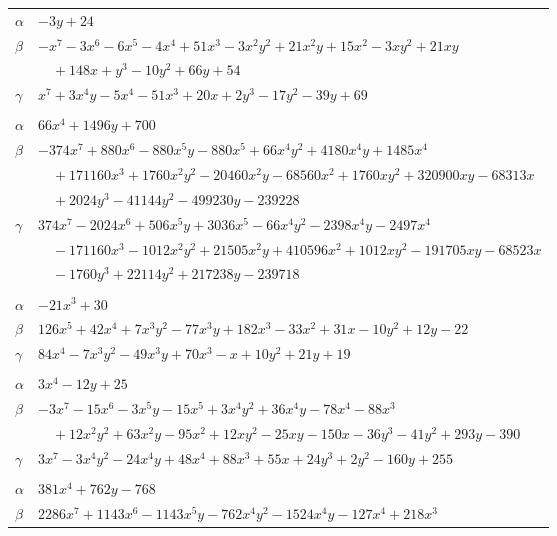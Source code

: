 \documentclass[11pt]{article}
\begin{document}
\begin{longtable}{@{}ll@{}}
$\alpha$ & $-3y+24$\\
$\beta$ & $-x^{7}-3x^{6}-6x^{5}-4x^{4}+51x^{3}-3x^{2}y^{2}+21x^{2}y+15x^{2}-3xy^{2}+21xy$\\
 & $\quad +148x+y^{3}-10y^{2}+66y+54$\\
$\gamma$ & $x^{7}+3x^{4}y-5x^{4}-51x^{3}+20x+2y^{3}-17y^{2}-39y+69$\\
\addlinespace[3pt]
\multicolumn{2}{@{}l}{$\{i,j\}=\{34,91\}$, $k_{ij}=2\cdot 3\cdot 5\cdot 7$}\\
$\alpha$ & $66x^{4}+1496y+700$\\
$\beta$ & $-374x^{7}+880x^{6}-880x^{5}y-880x^{5}+66x^{4}y^{2}+4180x^{4}y+1485x^{4}$\\
 & $\quad +171160x^{3}+1760x^{2}y^{2}-20460x^{2}y-68560x^{2}+1760xy^{2}+320900xy-68313x$\\
 & $\quad +2024y^{3}-41144y^{2}-499230y-239228$\\
$\gamma$ & $374x^{7}-2024x^{6}+506x^{5}y+3036x^{5}-66x^{4}y^{2}-2398x^{4}y-2497x^{4}$\\
 & $\quad -171160x^{3}-1012x^{2}y^{2}+21505x^{2}y+410596x^{2}+1012xy^{2}-191705xy-68523x$\\
 & $\quad -1760y^{3}+22114y^{2}+217238y-239718$\\
\addlinespace[3pt]
\multicolumn{2}{@{}l}{$\{i,j\}=\{34,96\}$, $k_{ij}=2\cdot 3^{2}\cdot 5$}\\
$\alpha$ & $-21x^{3}+30$\\
$\beta$ & $126x^{5}+42x^{4}+7x^{3}y^{2}-77x^{3}y+182x^{3}-33x^{2}+31x-10y^{2}+12y-22$\\
$\gamma$ & $84x^{4}-7x^{3}y^{2}-49x^{3}y+70x^{3}-x+10y^{2}+21y+19$\\
\addlinespace[3pt]
\multicolumn{2}{@{}l}{$\{i,j\}=\{34,99\}$, $k_{ij}=2^{5}\cdot 5$}\\
$\alpha$ & $3x^{4}-12y+25$\\
$\beta$ & $-3x^{7}-15x^{6}-3x^{5}y-15x^{5}+3x^{4}y^{2}+36x^{4}y-78x^{4}-88x^{3}$\\
 & $\quad +12x^{2}y^{2}+63x^{2}y-95x^{2}+12xy^{2}-25xy-150x-36y^{3}-41y^{2}+293y-390$\\
$\gamma$ & $3x^{7}-3x^{4}y^{2}-24x^{4}y+48x^{4}+88x^{3}+55x+24y^{3}+2y^{2}-160y+255$\\
\addlinespace[3pt]
\multicolumn{2}{@{}l}{$\{i,j\}=\{35,57\}$, $k_{ij}=2\cdot 3^{2}\cdot 5\cdot 17$}\\
$\alpha$ & $381x^{4}+762y-768$\\
$\beta$ & $2286x^{7}+1143x^{6}-1143x^{5}y-762x^{4}y^{2}-1524x^{4}y-127x^{4}+218x^{3}$\\

\end{longtable}
\end{document}
